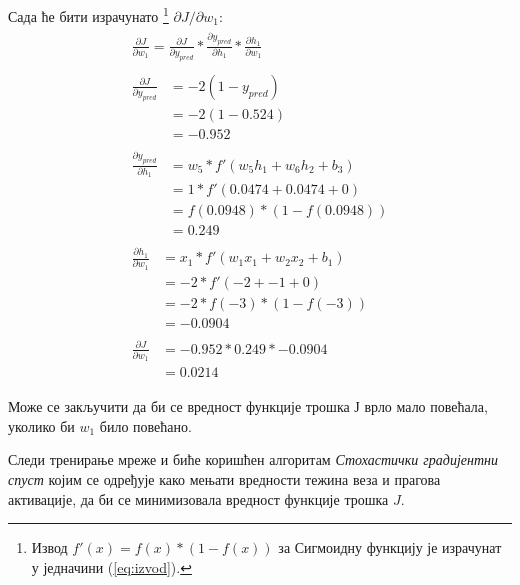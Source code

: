 \documentclass[12pt, а4paper]{article}
\begin{document}
Сада ће бити израчунато
\footnote{\label{izvod} Извод $f'(x) = f(x) * (1-f(x))$ за Сигмоидну функцију
је израчунат у једначини (\ref{eq:izvod}).}
$\partial J / \partial w_1$:
\begin{equation}
\begin{gathered}
\begin{split}
\frac{\partial J}{\partial w_1} = \frac{\partial J}{\partial y_{pred}} * \frac{\partial y_{pred}}{\partial h_1} * \frac{\partial h_1}{\partial w_1}
\end{split} \\
\begin{split}
\frac{\partial J}{\partial y_{pred}} & = -2 (1 - y_{pred}) \\
& = -2 (1 - 0.524) \\
& = -0.952
\end{split}\\
\begin{split}
\frac{\partial y_{pred}}{\partial h_1} & = w_5 * f'(w_5 h_1 + w_6 h_2 + b_3) \\
& = 1 * f'(0.0474 + 0.0474 + 0) \\
& = f(0.0948) * (1- f(0.0948)) \\
& = 0.249
\end{split} \\
\begin{split}
\frac{\partial h_1}{\partial w_1} & = x_1 * f'(w_1 x_1 + w_2 x_2 + b_1) \\
& = -2 * f'(-2 + -1 + 0) \\
& = -2 * f(-3) * (1 - f(-3)) \\
& = -0.0904
\end{split} \\
\begin{split}
\frac{\partial J}{\partial w_1} & = -0.952 * 0.249 * -0.0904 \\
& = 0.0214
\end{split}
\end{gathered}
\end{equation}

Може се закључити да би се вредност функције трошка $Ј$ врло мало повећала,
уколико би $w_1$ било повећано.

Следи тренирање мреже и биће коришћен алгоритам
\textit{Стохастички градијентни спуст} којим се одређује како
мењати вредности тежина веза и прагова активације, да би се
минимизовала вредност функције трошка $J$.
\end{document}
